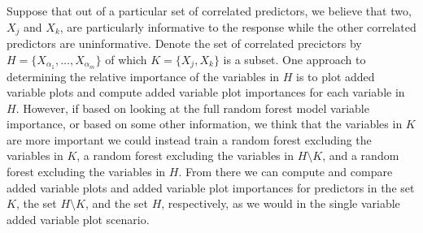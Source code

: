 \documentclass[12pt,twoside]{reedthesis}
\theoremstyle{definition}
\theoremstyle{definition}
\theoremstyle{definition}
\theoremstyle{remark}
\begin{document}
Suppose that out of a particular set of correlated predictors, we
believe that two, \(X_j\) and \(X_k\), are particularly informative to
the response while the other correlated predictors are uninformative.
Denote the set of correlated precictors by
\(H=\{X_{\alpha_1},\ldots,X_{\alpha_m}\}\) of which \(K=\{X_j,X_k\}\) is
a subset. One approach to determining the relative importance of the
variables in \(H\) is to plot added variable plots and compute added
variable plot importances for each variable in \(H\). However, if based
on looking at the full random forest model variable importance, or based
on some other information, we think that the variables in \(K\) are more
important we could instead train a random forest excluding the variables
in \(K\), a random forest excluding the variables in \(H\setminus K\),
and a random forest excluding the variables in \(H\). From there we can
compute and compare added variable plots and added variable plot
importances for predictors in the set \(K\), the set \(H\setminus K\),
and the set \(H\), respectively, as we would in the single variable
added variable plot scenario.
\end{document}
